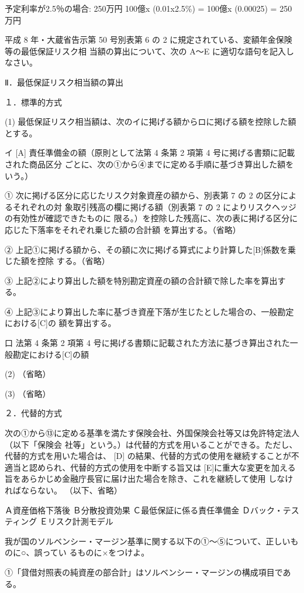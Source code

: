 \documentclass[report,gutter=10mm,fore-edge=10mm,uplatex,dvipdfmx]{jlreq}
\begin{document}
予定利率が2.5％の場合: 250万円
100億x (0.01x2.5\%) = 100億x (0.00025) = 250万円

平成 8 年・大蔵省告示第 50 号別表第 6 の 2 に規定されている、変額年金保険等の最低保証リスク相
当額の算出について、次の A～E に適切な語句を記入しなさい。

Ⅱ．最低保証リスク相当額の算出

１．標準的方式

(1) 最低保証リスク相当額は、次のイに掲げる額からロに掲げる額を控除した額とする。

イ [A] 責任準備金の額（原則として法第 4 条第 2 項第 4 号に掲げる書類に記載された商品区分
ごとに、次の①から④までに定める手順に基づき算出した額をいう。）

① 次に掲げる区分に応じたリスク対象資産の額から、別表第 7 の 2 の区分によるそれぞれの対
象取引残高の欄に掲げる額（別表第 7 の 2 によりリスクヘッジの有効性が確認できたものに
限る。）を控除した残高に、次の表に掲げる区分に応じた下落率をそれぞれ乗じた額の合計額
を算出する。（省略）

② 上記①に掲げる額から、その額に次に掲げる算式により計算した[B]係数を乗じた額を控除
する。（省略）

③ 上記②により算出した額を特別勘定資産の額の合計額で除した率を算出する。

④ 上記③により算出した率に基づき資産下落が生じたとした場合の、一般勘定における[C]の
額を算出する。

口 法第 4 条第 2 項第 4 号に掲げる書類に記載された方法に基づき算出された一般勘定における[C]の額

(2) （省略）

(3) （省略）

２．代替的方式

次の①から⑬に定める基準を満たす保険会社、外国保険会社等又は免許特定法人（以下「保険会
社等」という。）は代替的方式を用いることができる。ただし、代替的方式を用いた場合は、 [D]
の結果、代替的方式の使用を継続することが不適当と認められ、代替的方式の使用を中断する旨又は
[E]に重大な変更を加える旨をあらかじめ金融庁長官に届け出た場合を除き、これを継続して使用
しなければならない。
（以下、省略）

\answer{}
Ａ資産価格下落後
Ｂ分散投資効果
Ｃ最低保証に係る責任準備金
Ｄバック・テスティング
Ｅリスク計測モデル

我が国のソルベンシー・マージン基準に関する以下の①～⑤について、正しいものに○、誤ってい
るものに×をつけよ。

①「貸借対照表の純資産の部合計」はソルベンシー・マージンの構成項目である。
\end{document}
